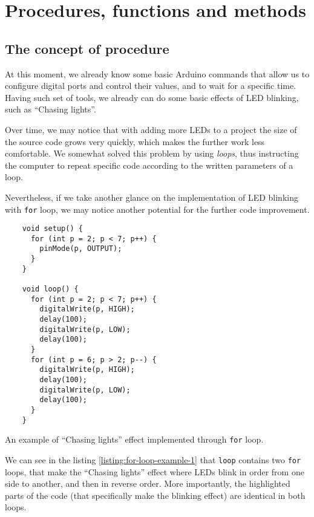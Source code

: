 \documentclass[../sparc.tex]{subfiles}
\begin{document}
\newpage
\section{Procedures, functions and methods}

\subsection{The concept of procedure}

At this moment, we already know some basic Arduino commands that allow us to
configure digital ports and control their values, and to wait for a specific
time.  Having such set of tools, we already can do some basic effects of LED
blinking, such as ``Chasing lights''.

Over time, we may notice that with adding more LEDs to a project the size of the
source code grows very quickly, which makes the further work less comfortable.
We somewhat solved this problem by using \emph{loops}, thus instructing the
computer to repeat specific code according to the written parameters of a loop.

Nevertheless, if we take another glance on the implementation of LED blinking
with \texttt{for} loop, we may notice another potential for the further
code improvement.

\begin{listing}[ht]
  \begin{verbatim}
    void setup() {
      for (int p = 2; p < 7; p++) {
        pinMode(p, OUTPUT);
      }
    }

    void loop() {
      for (int p = 2; p < 7; p++) {
        digitalWrite(p, HIGH);
        delay(100);
        digitalWrite(p, LOW);
        delay(100);
      }
      for (int p = 6; p > 2; p--) {
        digitalWrite(p, HIGH);
        delay(100);
        digitalWrite(p, LOW);
        delay(100);
      }
    }
  \end{verbatim}
  \label{listing:for-loop-example-1}
  \caption{An example of ``Chasing lights'' effect implemented through
    \texttt{for} loop.}
\end{listing}

We can see in the listing \ref{listing:for-loop-example-1} that
\texttt{loop} contains two \texttt{for} loops, that make the
``Chasing lights'' effect where LEDs blink in order from one side to another,
and then in reverse order.  More importantly, the highlighted parts of the code
(that specifically make the blinking effect) are identical in both loops.
\end{document}
